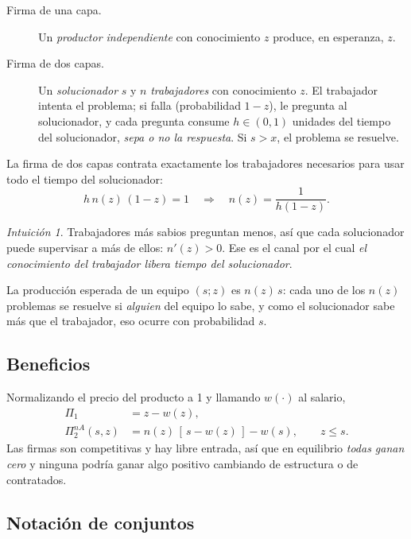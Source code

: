 \documentclass[11pt]{article}
\theoremstyle{definition}
\theoremstyle{remark}
\newtheorem*{intuicion}{Intuición}
\begin{document}
\begin{description}
  \item[Firma de una capa.] Un \emph{productor independiente} con conocimiento $z$ produce, en esperanza, $z$.
  \item[Firma de dos capas.] Un \emph{solucionador} $s$ y $n$ \emph{trabajadores} con conocimiento $z$. El trabajador intenta el problema; si falla (probabilidad $1-z$), le pregunta al solucionador, y cada pregunta consume $h\in(0,1)$ unidades del tiempo del solucionador, \emph{sepa o no la respuesta}. Si $s>x$, el problema se resuelve.
\end{description}

La firma de dos capas contrata exactamente los trabajadores necesarios para usar todo el tiempo del solucionador:
\begin{equation}\label{eq:n}
  h\, n(z)\,(1-z) = 1 \quad\Longrightarrow\quad n(z)=\frac{1}{h(1-z)} .
\end{equation}

\begin{intuicion}
Trabajadores más sabios preguntan menos, así que cada solucionador puede supervisar a más de ellos: $n'(z)>0$. Ese es el canal por el cual \emph{el conocimiento del trabajador libera tiempo del solucionador}.
\end{intuicion}

La producción esperada de un equipo $(s;z)$ es $n(z)\,s$: cada uno de los $n(z)$ problemas se resuelve si \emph{alguien} del equipo lo sabe, y como el solucionador sabe más que el trabajador, eso ocurre con probabilidad $s$.

\subsection{Beneficios}

Normalizando el precio del producto a 1 y llamando $w(\cdot)$ al salario,
\begin{align}
  \Pi_1 &= z - w(z), \label{eq:pi1}\\
  \Pi_2^{nA}(s,z) &= n(z)\,[\,s-w(z)\,] - w(s), \qquad z\le s. \label{eq:pi2}
\end{align}
Las firmas son competitivas y hay libre entrada, así que en equilibrio \emph{todas ganan cero} y ninguna podría ganar algo positivo cambiando de estructura o de contratados.

\subsection{Notación de conjuntos}
\end{document}
